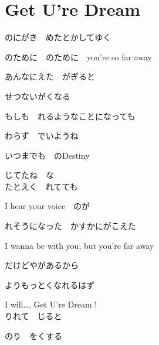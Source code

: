 \section{ Get U're Dream}
\large{

のにがき　めたとかしてゆく

のために　のために　you're so far away
\\


あんなにえた　がぎると

せつないがくなる

もしも　れるようなことになっても

わらず　でいようね

いつまでも　のDestiny

じてたね　な
\\

たとえく　れてても

I hear your voice　のが

れそうになった　かすかにがこえた

I wanna be with you, but you're far away

だけどやがあるから

よりもっとくなれるはず

I will…, Get U're Dream !
\\

りれて　じると

のり　をくする

}

